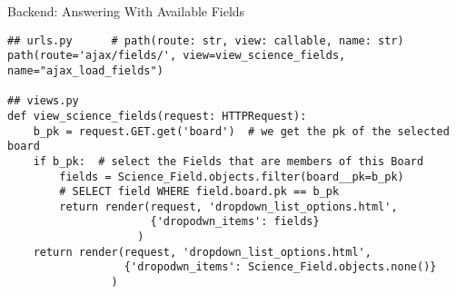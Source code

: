 \begin{frame}[c,fragile]{Backend: Answering With Available Fields}
\footnotesize
    \begin{verbatim}
## urls.py      # path(route: str, view: callable, name: str)
path(route='ajax/fields/', view=view_science_fields, name="ajax_load_fields")

## views.py
def view_science_fields(request: HTTPRequest):
    b_pk = request.GET.get('board')  # we get the pk of the selected board
    if b_pk:  # select the Fields that are members of this Board
        fields = Science_Field.objects.filter(board__pk=b_pk) 
        # SELECT field WHERE field.board.pk == b_pk
        return render(request, 'dropdown_list_options.html',
                      {'dropodwn_items': fields}
                    )
    return render(request, 'dropdown_list_options.html',
                  {'dropodwn_items': Science_Field.objects.none()}
                )
\end{verbatim}
\end{frame}

